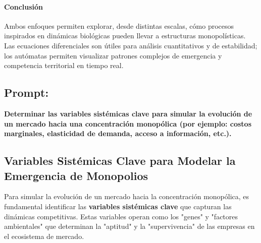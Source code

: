 \documentclass[a4paper,12pt]{article}
\begin{document}
\paragraph{Conclusión} Ambos enfoques permiten explorar, desde distintas escalas, cómo procesos inspirados en dinámicas biológicas pueden llevar a estructuras monopolísticas. Las ecuaciones diferenciales son útiles para análisis cuantitativos y de estabilidad; los autómatas permiten visualizar patrones complejos de emergencia y competencia territorial en tiempo real.

\subsection*{Prompt:}
\textbf{Determinar las variables sistémicas clave para simular la evolución de un mercado hacia una concentración monopólica (por ejemplo: costos marginales, elasticidad de demanda, acceso a información, etc.).}
\subsection*{Variables Sistémicas Clave para Modelar la Emergencia de Monopolios}

Para simular la evolución de un mercado hacia la concentración monopólica, es fundamental identificar las \textbf{variables sistémicas clave} que capturan las dinámicas competitivas. Estas variables operan como los "genes" y "factores ambientales" que determinan la "aptitud" y la "supervivencia" de las empresas en el ecosistema de mercado.
\end{document}
